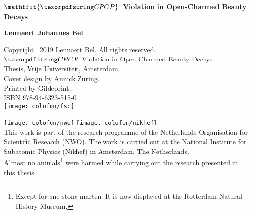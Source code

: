 \thispagestyle{empty}
\begin{center}


\vspace*{.0666666667\paperheight}
\vspace*{2\baselineskip}

{\Large \textbf{\(\mathbfit{\CP}\)~Violation in Open-Charmed Beauty Decays}}

\vfill

\textbf{Lennaert Johannes Bel}

\vspace*{\baselineskip}
\vspace*{\baselineskip}

\end{center}

\clearpage
\thispagestyle{empty}

\noindent Copyright \textcopyright~2019 Lennaert Bel. All rights reserved.\\
\(\CP\) Violation in Open-Charmed Beauty Decays\\
Thesis, Vrije Universiteit, Amsterdam\\

\noindent Cover design by Annick Zuring.\\
Printed by Gildeprint.\\
ISBN 978-94-6323-515-0\\

\vspace{\baselineskip}
\noindent\texttt{[image: colofon/fsc]}

\vfill

\noindent\texttt{[image: colofon/nwo]} \hfill \texttt{[image: colofon/nikhef]}\\

\noindent This work is part of the research programme of the Netherlands Organisation for Scientific Research (NWO).
The work is carried out at the National Institute for Subatomic Physics (Nikhef) in Amsterdam, The Netherlands.\\

\noindent Almost no animals\footnote{Except for one stone marten. It is now displayed at the Rotterdam Natural History Museum.} were harmed while carrying out the research presented in this thesis.
